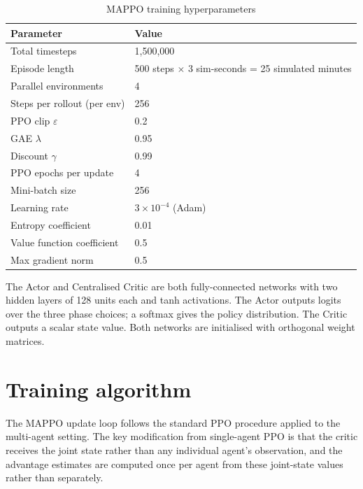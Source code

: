 \documentclass[11pt, a4paper]{report}
\begin{document}
\begin{table}[H]
\centering
\caption{MAPPO training hyperparameters}
\label{tab:hyperparams}
\begin{tabular}{ll}
\toprule
\textbf{Parameter} & \textbf{Value} \\
\midrule
Total timesteps & 1,500,000 \\
Episode length & 500 steps $\times$ 3 sim-seconds = 25 simulated minutes \\
Parallel environments & 4 \\
Steps per rollout (per env) & 256 \\
PPO clip $\varepsilon$ & 0.2 \\
GAE $\lambda$ & 0.95 \\
Discount $\gamma$ & 0.99 \\
PPO epochs per update & 4 \\
Mini-batch size & 256 \\
Learning rate & $3 \times 10^{-4}$ (Adam) \\
Entropy coefficient & 0.01 \\
Value function coefficient & 0.5 \\
Max gradient norm & 0.5 \\
\bottomrule
\end{tabular}
\end{table}

The Actor and Centralised Critic are both fully-connected networks with two hidden layers of 128 units each and tanh activations. The Actor outputs logits over the three phase choices; a softmax gives the policy distribution. The Critic outputs a scalar state value. Both networks are initialised with orthogonal weight matrices.

\section{Training algorithm}

The MAPPO update loop follows the standard PPO procedure applied to the multi-agent setting. The key modification from single-agent PPO is that the critic receives the joint state rather than any individual agent's observation, and the advantage estimates are computed once per agent from these joint-state values rather than separately.
\end{document}
